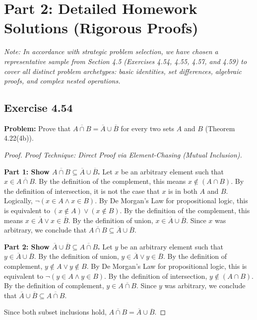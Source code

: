 \documentclass[11pt, a4paper]{article}
\theoremstyle{definition}
\theoremstyle{remark}
\begin{document}
\section{Part 2: Detailed Homework Solutions (Rigorous Proofs)}

\textit{Note: In accordance with strategic problem selection, we have chosen a representative sample from Section 4.5 (Exercises 4.54, 4.55, 4.57, and 4.59) to cover all distinct problem archetypes: basic identities, set differences, algebraic proofs, and complex nested operations.}

\subsection{Exercise 4.54}
\textbf{Problem:} Prove that $\overline{A \cap B} = \overline{A} \cup \overline{B}$ for every two sets $A$ and $B$ (Theorem 4.22(4b)).

\begin{proof}
\textit{Proof Technique: Direct Proof via Element-Chasing (Mutual Inclusion).}

\textbf{Part 1: Show $\overline{A \cap B} \subseteq \overline{A} \cup \overline{B}$.}
Let $x$ be an arbitrary element such that $x \in \overline{A \cap B}$. 
By the definition of the complement, this means $x \notin (A \cap B)$.
By the definition of intersection, it is not the case that $x$ is in both $A$ and $B$. Logically, $\neg(x \in A \land x \in B)$.
By De Morgan's Law for propositional logic, this is equivalent to $(x \notin A) \lor (x \notin B)$.
By the definition of the complement, this means $x \in \overline{A} \lor x \in \overline{B}$.
By the definition of union, $x \in \overline{A} \cup \overline{B}$.
Since $x$ was arbitrary, we conclude that $\overline{A \cap B} \subseteq \overline{A} \cup \overline{B}$.

\textbf{Part 2: Show $\overline{A} \cup \overline{B} \subseteq \overline{A \cap B}$.}
Let $y$ be an arbitrary element such that $y \in \overline{A} \cup \overline{B}$.
By the definition of union, $y \in \overline{A} \lor y \in \overline{B}$.
By the definition of complement, $y \notin A \lor y \notin B$.
By De Morgan's Law for propositional logic, this is equivalent to $\neg(y \in A \land y \in B)$.
By the definition of intersection, $y \notin (A \cap B)$.
By the definition of complement, $y \in \overline{A \cap B}$.
Since $y$ was arbitrary, we conclude that $\overline{A} \cup \overline{B} \subseteq \overline{A \cap B}$.

Since both subset inclusions hold, $\overline{A \cap B} = \overline{A} \cup \overline{B}$.
\end{proof}
\end{document}
